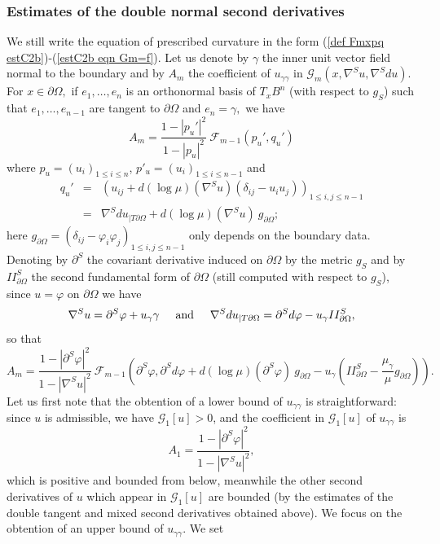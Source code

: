 \documentclass[10pt,reqno,oneside]{amsart}
\theoremstyle{definition}
\theoremstyle{remark}
\begin{document}
\subsubsection{Estimates of the double normal second derivatives} We still write the equation of prescribed curvature in the form (\ref{def Fmxpq estC2b})-(\ref{estC2b eqn Gm=f}). Let us denote by $\gamma$ the inner unit vector field normal to the boundary and by $A_m$ the coefficient of $u_{\gamma\gamma}$ in $\mathcal{G}_m(x,\nabla^Su,\nabla^Sdu).$ For $x\in\partial\Omega,$ if $e_1,\ldots,e_n$ is an orthonormal basis of $T_xB^n$ (with respect to $g_S$) such that $e_1,\ldots,e_{n-1}$ are tangent to $\partial\Omega$ and $e_n=\gamma,$ we have
$$A_m= \frac{1-|p_u'|^2}{1-|p_u|^2}\ \mathcal{F}_{m-1}(p_u',q_u')$$
where $p_u=(u_i)_{1\leq i\leq n}$, $p'_u=(u_i)_{1\leq i\leq n-1}$ and 
\begin{eqnarray*}
q_u'&=&\left(u_{ij}+d(\log\mu)(\nabla^S u)\left(\delta_{ij}-u_iu_j\right)\right)_{1\leq i,j\leq n-1}\\
&=&\nabla^Sdu_{|T\partial\Omega}+d(\log\mu)(\nabla^S u)\ g_{\partial\Omega};
\end{eqnarray*}
here $\displaystyle{g_{\partial\Omega}=(\delta_{ij}-\varphi_i\varphi_j)_{1\leq i,j\leq n-1}}$ only depends on the boundary data. Denoting by $\partial^S$ the covariant derivative induced on $\partial\Omega$ by the metric $g_S$ and by $II^S_{\partial\Omega}$ the second fundamental form of $\partial\Omega$ (still computed with respect to $g_S$), since $u=\varphi$ on $\partial\Omega$ we have
$$\nabla^Su=\partial^S\varphi+u_\gamma \gamma\hspace{.5cm}\mbox{and}\hspace{.5cm}\nabla^S du_{|T\partial\Omega}=\partial^Sd\varphi-u_\gamma II^S_{\partial\Omega},$$
so that
$$A_m=\frac{1-|\partial^S\varphi|^2}{1-|\nabla^S u|^2}\ \mathcal{F}_{m-1}\left(\partial^S\varphi,\partial^Sd\varphi+d(\log\mu)(\partial^S\varphi)\ g_{\partial\Omega}-u_\gamma\left(II^S_{\partial\Omega}-\frac{\mu_\gamma}{\mu}g_{\partial\Omega}\right)\right).$$
Let us first note that the obtention of a lower bound of $u_{\gamma\gamma}$ is straightforward: since $u$ is admissible, we have $\mathcal{G}_1[u]>0$, and the coefficient in $\mathcal{G}_1[u]$ of $u_{\gamma\gamma}$ is
$$A_1=\frac{1-|\partial^S\varphi|^2}{1-|\nabla^S u|^2},$$
which is positive and bounded from below, meanwhile the other second derivatives of $u$ which appear in $\mathcal{G}_1[u]$ are bounded (by the estimates of the double tangent and mixed second derivatives obtained above). We focus on the obtention of an upper bound of $u_{\gamma\gamma}.$ We set
\end{document}
